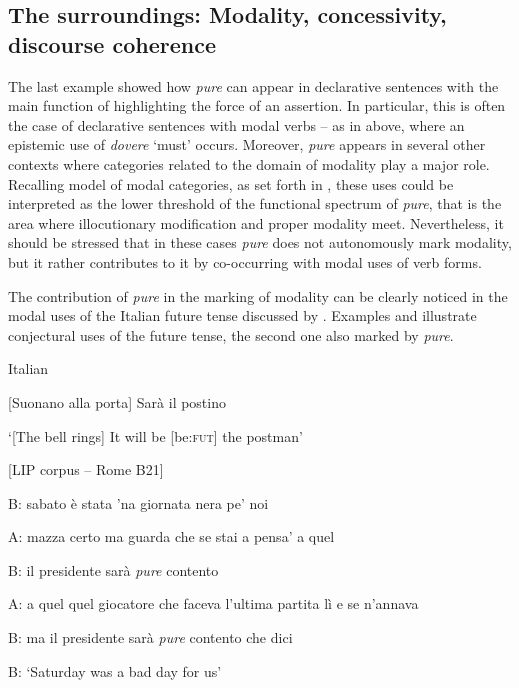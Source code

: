\subsection{The surroundings: Modality, concessivity, discourse coherence}
\hypertarget{Toc124860651}{}
The last example showed how \textit{pure} can appear in declarative sentences with the main function of highlighting the force of an assertion. In particular, this is often the case of declarative sentences with modal verbs – as in  above, where an epistemic use of \textit{dovere} ‘must’ occurs. Moreover, \textit{pure} appears in several other contexts where categories related to the domain of modality play a major role. Recalling  model of modal categories, as set forth in , these uses could be interpreted as the lower threshold of the functional spectrum of \textit{pure}, that is the area where illocutionary modification and proper modality meet. Nevertheless, it should be stressed that in these cases \textit{pure} does not autonomously mark modality, but it rather contributes to it by co-occurring with modal uses of verb forms.

The contribution of \textit{pure} in the marking of modality can be clearly noticed in the modal uses of the Italian future tense discussed by \citet{Squartini2012}. Examples  and  illustrate conjectural uses of the future tense, the second one also marked by \textit{pure}.

\ea%
    \label{ex:key:25}

           Italian \citep[2118]{Squartini2012}

[Suonano alla porta] Sarà il postino

\glt ‘[The bell rings] It will be [be:\textsc{fut}] the postman’
    \z

\ea%
    \label{ex:key:26}

           [LIP corpus – Rome B21]

B:   sabato è stata ’na giornata nera pe’ noi

A:   mazza certo ma guarda che se stai a pensa’ a quel

B:   il presidente sarà \textit{pure} contento

A:   a quel quel giocatore che faceva l’ultima partita lì e se n’annava

B:   ma il presidente sarà \textit{pure} contento che dici


\glt 
B:  ‘Saturday was a bad day for us’

